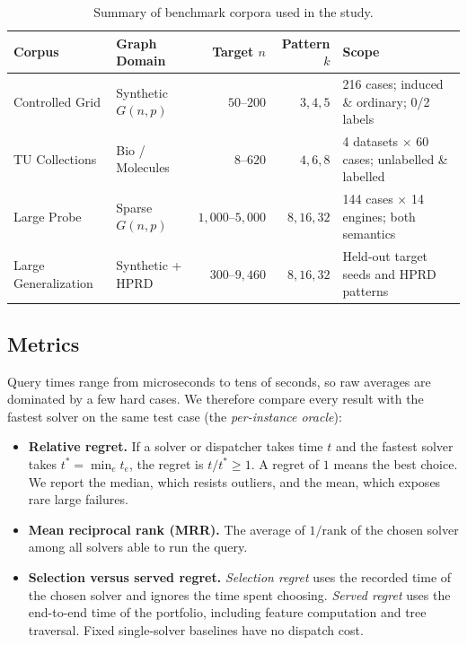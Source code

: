 \documentclass[11pt,a4paper]{article}
\begin{document}
\begin{table}[t]
\centering
\caption{Summary of benchmark corpora used in the study.}
\label{tab:corpora}
\footnotesize
\setlength{\tabcolsep}{5pt}
\begin{tabularx}{\textwidth}{@{}llrrY@{}}
\toprule
\textbf{Corpus} & \textbf{Graph Domain} & \textbf{Target $n$} & \textbf{Pattern $k$} & \textbf{Scope} \\
\midrule
Controlled Grid & Synthetic $G(n,p)$ & $50\text{--}200$ & $3, 4, 5$ & 216 cases; induced \& ordinary; 0/2 labels \\
TU Collections & Bio / Molecules & $8\text{--}620$ & $4, 6, 8$ & 4 datasets $\times$ 60 cases; unlabelled \& labelled \\
Large Probe & Sparse $G(n,p)$ & $1{,}000\text{--}5{,}000$ & $8, 16, 32$ & 144 cases $\times$ 14 engines; both semantics \\
Large Generalization & Synthetic + HPRD & $300\text{--}9{,}460$ & $8, 16, 32$ & Held-out target seeds and HPRD patterns \\
\bottomrule
\end{tabularx}
\end{table}

\subsection{Metrics}

Query times range from microseconds to tens of seconds, so raw averages are dominated by a few hard cases. We therefore compare every result with the fastest solver on the same test case (the \emph{per-instance oracle}):
\begin{itemize}
    \item \textbf{Relative regret.} If a solver or dispatcher takes time $t$ and the fastest solver takes $t^* = \min_e t_e$, the regret is $t / t^* \ge 1$. A regret of $1$ means the best choice. We report the median, which resists outliers, and the mean, which exposes rare large failures.
    \item \textbf{Mean reciprocal rank (MRR).} The average of $1/\text{rank}$ of the chosen solver among all solvers able to run the query.
    \item \textbf{Selection versus served regret.} \emph{Selection regret} uses the recorded time of the chosen solver and ignores the time spent choosing. \emph{Served regret} uses the end-to-end time of the portfolio, including feature computation and tree traversal. Fixed single-solver baselines have no dispatch cost.
\end{itemize}
\end{document}

